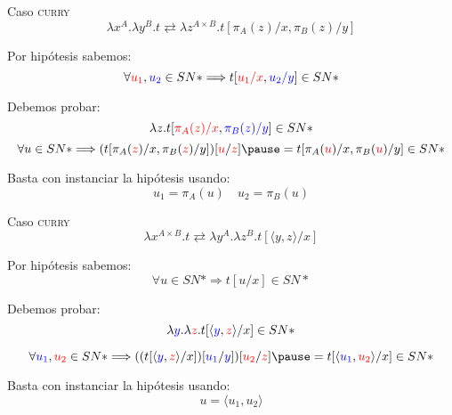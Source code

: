 \begin{frame}{Caso \textsc{curry}}
	\[ \lambda x^A. \lambda y^B. t \rightleftarrows \lambda z^{A \times B}. t[\pi_A(z)/x, \pi_B(z)/y] \]
	\pause
	
	Por hipótesis sabemos:
	\[ \forall \textcolor{red}{u_1}, \textcolor{blue}{u_2} \in SN* \Longrightarrow t[\textcolor{red}{u_1/x}, \textcolor{blue}{u_2/y}] \in SN* \]
	\pause
	
	Debemos probar:
	\[ \lambda z. t[\textcolor{red}{\pi_A(z)/x}, \textcolor{blue}{\pi_B(z)/y}] \in SN* \]
	\pause
	\[ \forall u \in SN* \Longrightarrow (t[\pi_A(\textcolor{red}{z})/x, \pi_B(\textcolor{red}{z})/y])[\textcolor{red}{u}/\textcolor{red}{z}] \pause = t[\pi_A(\textcolor{red}{u})/x, \pi_B(\textcolor{red}{u})/y] \in SN* \]
	 
	\pause
	Basta con instanciar la hipótesis usando:
	\[ u_1 = \pi_A(u) \quad u_2 = \pi_B(u) \]
\end{frame}

\begin{frame}{Caso \textsc{curry}}
	\[ \lambda x^{A \times B}. t \rightleftarrows \lambda y^A. \lambda z^B. t[\langle y, z \rangle/x] \]
	\pause
	
	Por hipótesis sabemos:
	\[ \forall u \in SN* \Longrightarrow t[u/x] \in SN* \]
	\pause
	
	Debemos probar:
	\[ \lambda \textcolor{blue}{y}. \lambda \textcolor{red}{z}. t[\langle \textcolor{blue}{y}, \textcolor{red}{z} \rangle/x] \in SN* \]
	
	\pause
	\[ \forall \textcolor{blue}{u_1}, \textcolor{red}{u_2} \in SN* \Longrightarrow ((t[\langle \textcolor{blue}{y}, \textcolor{red}{z} \rangle/x])[\textcolor{blue}{u_1}/\textcolor{blue}{y}])[\textcolor{red}{u_2}/\textcolor{red}{z}] \pause = t[\langle \textcolor{blue}{u_1}, \textcolor{red}{u_2} \rangle/x] \in SN* \]

	\pause
	Basta con instanciar la hipótesis usando:
	\[ u = \langle u_1, u_2 \rangle \]
\end{frame}
